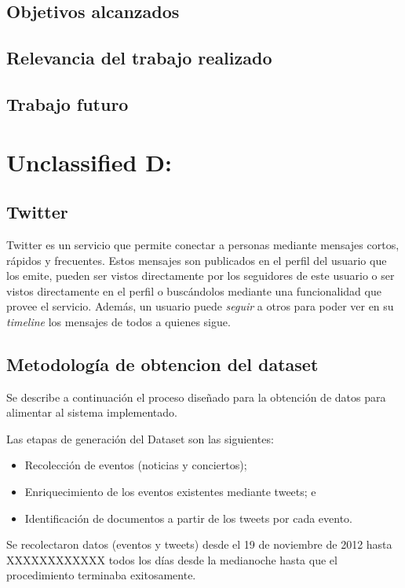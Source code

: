 \documentclass[upright, contnum]{umemoria}
\begin{document}
{\section{Objetivos alcanzados}
\label{sec-5.2}

\section{Relevancia del trabajo realizado}
\label{sec-5.3}

\section{Trabajo futuro}
\label{sec-5.4}


   
\chapter{Unclassified D:}
\label{sec-6}

  

\section{Twitter}
\label{sec-6.1}

Twitter es un servicio que permite conectar a personas mediante
mensajes cortos, rápidos y frecuentes. Estos mensajes son publicados
en el perfil del usuario que los emite, pueden ser vistos directamente
por los seguidores de este usuario o ser vistos directamente en el
perfil o buscándolos mediante una funcionalidad que provee el
servicio. Además, un usuario puede \emph{seguir} a otros para poder ver en
su \emph{timeline} los mensajes de todos a quienes sigue.


\section{Metodología de obtencion del dataset}
\label{sec-6.2}


Se describe a continuación el proceso diseñado para la obtención de
datos para alimentar al sistema implementado.

Las etapas de generación del Dataset son las siguientes:

\begin{itemize}
\item Recolección de eventos (noticias y conciertos);
\item Enriquecimiento de los eventos existentes mediante tweets; e
\item Identificación de documentos a partir de los tweets por cada evento.
\end{itemize}
Se recolectaron datos (eventos y tweets) desde el 19 de noviembre de
2012 hasta XXXXXXXXXXXX todos los días desde la medianoche hasta que
el procedimiento terminaba exitosamente.

}
\end{document}
